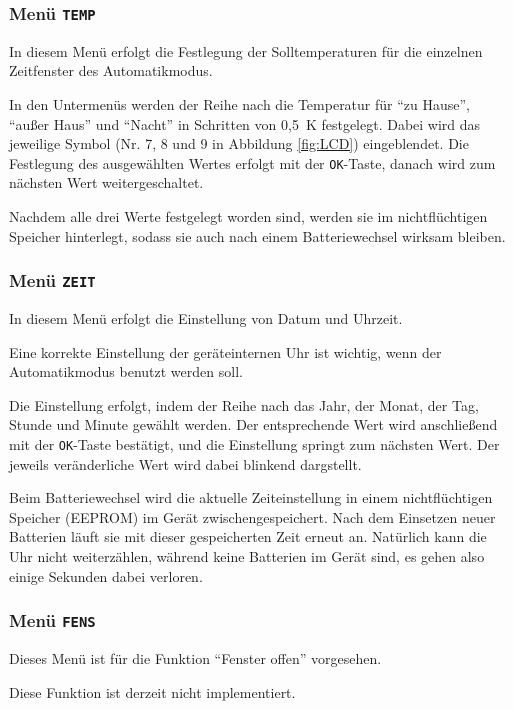 \documentclass[a5paper,twoside]{article}
\begin{document}
\subsubsection {
  Menü \texttt{TEMP}\label{menu:temp}
}

In diesem Menü erfolgt die Festlegung der Solltemperaturen für die
einzelnen Zeitfenster des Automatikmodus.

In den Untermenüs werden der Reihe nach die Temperatur für "`zu
Hause"', "`außer Haus"' und "`Nacht"' in Schritten von 0,5~K
festgelegt.  Dabei wird das jeweilige Symbol (Nr. 7, 8 und 9
in Abbildung \ref{fig:LCD}) eingeblendet.  Die Festlegung des
ausgewählten Wertes erfolgt mit der \texttt{OK}-Taste, danach
wird zum nächsten Wert weitergeschaltet.

Nachdem alle drei Werte festgelegt worden sind, werden sie im
nichtflüchtigen Speicher hinterlegt, sodass sie auch nach einem
Batteriewechsel wirksam bleiben.

\subsubsection {
  Menü \texttt{ZEIT}\label{menu:zeit}
}

In diesem Menü erfolgt die Einstellung von Datum und Uhrzeit.

Eine korrekte Einstellung der geräteinternen Uhr ist wichtig, wenn
der Automatikmodus benutzt werden soll.

Die Einstellung erfolgt, indem der Reihe nach das Jahr, der Monat,
der Tag, Stunde und Minute gewählt werden.  Der entsprechende Wert
wird anschließend mit der \texttt{OK}-Taste bestätigt, und die
Einstellung springt zum nächsten Wert.  Der jeweils veränderliche
Wert wird dabei blinkend dargstellt.

Beim Batteriewechsel wird die aktuelle Zeiteinstellung in einem
nichtflüchtigen Speicher (EEPROM) im Gerät zwischengespeichert.  Nach
dem Einsetzen neuer Batterien läuft sie mit dieser gespeicherten Zeit
erneut an.  Natürlich kann die Uhr nicht weiterzählen, während keine
Batterien im Gerät sind, es gehen also einige Sekunden dabei
verloren.

\subsubsection {
  Menü \texttt{FENS}
}

Dieses Menü ist für die Funktion "`Fenster offen"' vorgesehen.

Diese Funktion ist derzeit nicht implementiert.
\end{document}
